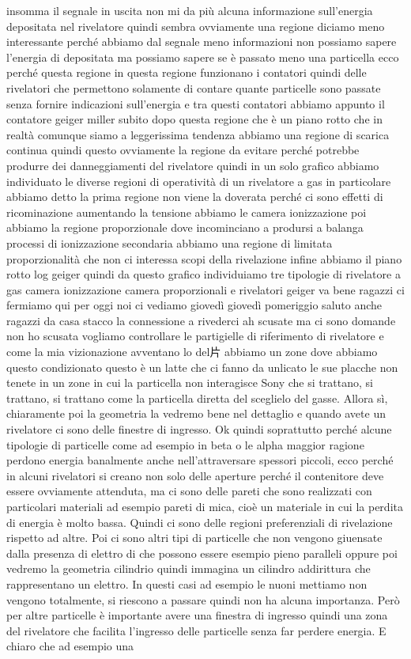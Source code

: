 {insomma il segnale in uscita non mi da più alcuna informazione sull'energia depositata nel rivelatore quindi sembra ovviamente una regione diciamo meno interessante perché abbiamo dal segnale meno informazioni non possiamo sapere l'energia di depositata ma possiamo sapere se è passato meno una particella ecco perché questa regione in questa regione funzionano i contatori quindi delle rivelatori che permettono solamente di contare quante particelle sono passate senza fornire indicazioni sull'energia e tra questi contatori abbiamo appunto il contatore geiger miller subito dopo questa regione che è un piano rotto che in realtà comunque siamo a leggerissima tendenza abbiamo una regione di scarica continua quindi questo ovviamente la regione da evitare perché potrebbe produrre dei danneggiamenti del rivelatore quindi in un solo grafico abbiamo individuato le diverse regioni di operatività di un rivelatore a gas in particolare abbiamo detto la prima regione non viene la doverata perché ci sono effetti di ricominazione aumentando la tensione abbiamo le camera ionizzazione poi abbiamo la regione proporzionale dove incominciano a prodursi a balanga processi di ionizzazione secondaria abbiamo una regione di limitata proporzionalità che non ci interessa scopi della rivelazione infine abbiamo il piano rotto log geiger quindi da questo grafico individuiamo tre tipologie di rivelatore a gas camera ionizzazione camera proporzionali e rivelatori geiger va bene ragazzi ci fermiamo qui per oggi noi ci vediamo giovedì giovedì pomeriggio saluto anche ragazzi da casa stacco la connessione a rivederci ah scusate ma ci sono domande non ho scusata vogliamo controllare le partigielle di riferimento di rivelatore e come la mia vizionazione avventano lo del片 abbiamo un zone dove abbiamo questo condizionato questo è un latte che ci fanno da unlicato le sue placche non tenete in un zone in cui la particella non interagisce Sony che si trattano, si trattano, si trattano come la particella diretta del sceglielo del gasse. Allora sì, chiaramente poi la geometria la vedremo bene nel dettaglio e quando avete un rivelatore ci sono delle finestre di ingresso. Ok quindi soprattutto perché alcune tipologie di particelle come ad esempio in beta o le alpha maggior ragione perdono energia banalmente anche nell'attraversare spessori piccoli, ecco perché in alcuni rivelatori si creano non solo delle aperture perché il contenitore deve essere ovviamente attenduta, ma ci sono delle pareti che sono realizzati con particolari materiali ad esempio pareti di mica, cioè un materiale in cui la perdita di energia è molto bassa. Quindi ci sono delle regioni preferenziali di rivelazione rispetto ad altre. Poi ci sono altri tipi di particelle che non vengono giuensate dalla presenza di elettro di che possono essere esempio pieno paralleli oppure poi vedremo la geometria cilindrio quindi immagina un cilindro addirittura che rappresentano un elettro. In questi casi ad esempio le nuoni mettiamo non vengono totalmente, si riescono a passare quindi non ha alcuna importanza. Però per altre particelle è importante avere una finestra di ingresso quindi una zona del rivelatore che facilita l'ingresso delle particelle senza far perdere energia. E chiaro che ad esempio una }
